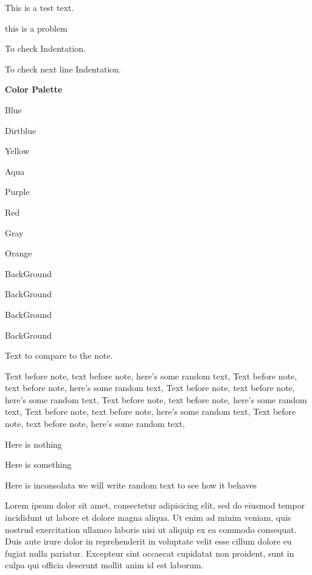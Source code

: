 \documentclass[11pt]{article}
\begin{document}
    This is a test text.


    \begin{problem*}
        this is a problem
    \end{problem*}

   To check Indentation.


   To check next line Indentation.


   \textbf{Color Palette}

   {\color{G blue} Blue}

   {\color{G dirtblue} Dirtblue}

   {\color{G yellow} Yellow}

   {\color{G aqua} Aqua}

   {\color{G purple} Purple}

   {\color{G red} Red}

   {\color{G gray} Gray}

   {\color{G orange} Orange}


   {\color{G bg} BackGround}

   {\color{G bg1} BackGround}

   {\color{G bg2} BackGround}

   {\color{G bg3} BackGround}
\newpage

Text to compare to the note.

Text before note, text before note, here's some random text,
Text before note, text before note, here's some random text,
Text before note, text before note, here's some random text,
Text before note, text before note, here's some random text,
Text before note, text before note, here's some random text,
Text before note, text before note, here's some random text,


\newpage
{}



\newpage
{}

{\Titillium Here is nothing}

Here is something

{\Inconsolata Here is inconsolata we will write random text to see how it behaves}



Lorem ipsum dolor sit amet, consectetur adipisicing elit, sed do eiusmod tempor incididunt ut labore et dolore magna aliqua. Ut enim ad minim veniam, quis nostrud exercitation ullamco laboris nisi ut aliquip ex ea commodo consequat. Duis aute irure dolor in reprehenderit in voluptate velit esse cillum dolore eu fugiat nulla pariatur. Excepteur sint occaecat cupidatat non proident, sunt in culpa qui officia deserunt mollit anim id est laborum.
\end{document}
